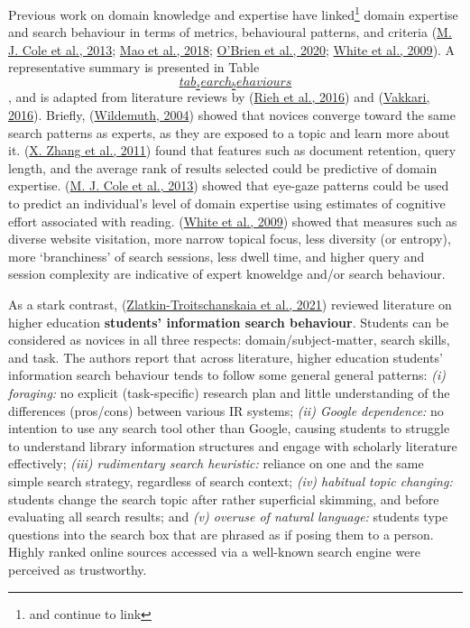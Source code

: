 \documentclass[a4paper, nobind]{templates/ociamthesis}
\begin{document}
Previous work on domain knowledge and expertise have linked\footnote{and continue to link} domain
expertise and search behaviour in terms of metrics, behavioural
patterns, and criteria
(\protect\hyperlink{ref-cole2013inferring}{M. J. Cole et al., 2013}; \protect\hyperlink{ref-133}{Mao et al., 2018}; \protect\hyperlink{ref-o2020role}{O'Brien et al., 2020}; \protect\hyperlink{ref-white2009characterizing}{White et al., 2009}). A
representative summary is presented in Table
\protect\hyperlink{tab_search_behaviours}{\[tab_search_behaviours\]}, and is adapted from literature
reviews by (\protect\hyperlink{ref-rieh2016searching}{Rieh et al., 2016}) and (\protect\hyperlink{ref-vakkari2016searching}{Vakkari, 2016}). Briefly,
(\protect\hyperlink{ref-wildemuth2004effects}{Wildemuth, 2004}) showed that novices converge toward the same
search patterns as experts, as they are exposed to a topic and learn
more about it. (\protect\hyperlink{ref-zhang2011predicting}{X. Zhang et al., 2011}) found that features such as
document retention, query length, and the average rank of results
selected could be predictive of domain expertise. (\protect\hyperlink{ref-cole2013inferring}{M. J. Cole et al., 2013})
showed that eye-gaze patterns could be used to predict an individual's
level of domain expertise using estimates of cognitive effort associated
with reading. (\protect\hyperlink{ref-white2009characterizing}{White et al., 2009}) showed that measures such as
diverse website visitation, more narrow topical focus, less diversity
(or entropy), more `branchiness' of search sessions, less dwell time,
and higher query and session complexity are indicative of expert
knoweldge and/or search behaviour.

As a stark contrast, (\protect\hyperlink{ref-zlatkin2021students}{Zlatkin-Troitschanskaia et al., 2021}) reviewed literature on
higher education \textbf{students' information search behaviour}. Students
can be considered as novices in all three respects:
domain/subject-matter, search skills, and task. The authors report that
across literature, higher education students' information search
behaviour tends to follow some general general patterns: \emph{(i) foraging:}
no explicit (task-specific) research plan and little understanding of
the differences (pros/cons) between various IR systems; \emph{(ii) Google
dependence:} no intention to use any search tool other than Google,
causing students to struggle to understand library information
structures and engage with scholarly literature effectively; \emph{(iii)
rudimentary search heuristic:} reliance on one and the same simple
search strategy, regardless of search context; \emph{(iv) habitual topic
changing:} students change the search topic after rather superficial
skimming, and before evaluating all search results; and \emph{(v) overuse of
natural language:} students type questions into the search box that are
phrased as if posing them to a person. Highly ranked online sources
accessed via a well-known search engine were perceived as trustworthy.
\end{document}
